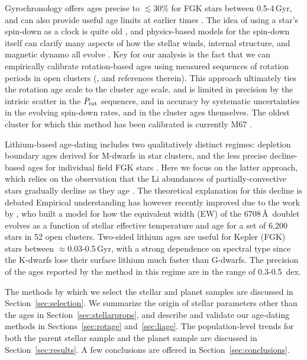 \documentclass[11pt,twocolumn,tighten]{aastex63}
\begin{document}
Gyrochronology offers ages precise to $\lesssim$30\% for FGK stars
between 0.5-4\,Gyr, and can also provide useful age limits at
earlier times \citep{Bouma_2023}.  The idea of using a star's
spin-down as a clock is quite old
\citep{Skumanich_1972,Noyes_1984,Kawaler_1989,Barnes03,Mamajek_2008,Angus_2015},
and physics-based models for the spin-down itself can clarify many
aspects of how the stellar winds, internal structure, and magnetic
dynamo all evolve
\citep[e.g.][]{Matt_2015,Gallet_Bouvier_2015,Spada_2020}.  Key
for our analysis is the fact that we can empirically calibrate
rotation-based ages using measured sequences of rotation periods
in open clusters
(\citealt{Bouma_2023}, and references therein).  This approach
ultimately ties the rotation age scale to the cluster age scale, and
is limited in precision by the intrisic scatter in the $P_{\rm rot}$
sequences, and in accuracy by systematic uncertainties in the evolving
spin-down rates, and in the cluster ages themselves.
The oldest cluster for which this method has been calibrated is currently
M67 \citep[$\approx$4\,Gyr][]{2022ApJ...938..118D}.

Lithium-based age-dating includes two qualitatively distinct regimes:
depletion boundary ages derived for M-dwarfs in star clusters, and the
less precise decline-based ages for individual field FGK stars
\citep{Soderblom_2010}.  Here we focus on the latter approach, which
relies on the observation that the Li abundances of
partially-convective stars gradually decline as they age
\citep[e.g.][]{2005A&A...442..615S}.  The theoretical explanation for
this decline is debated
\citep[e.g.][]{1995ApJ...441..865C,2010ApJ...716.1269D,2019MNRAS.485.4052C}
Empirical understanding has however recently improved due to the work
by \citet{Jeffries_2023}, who built a model for how the equivalent
width (EW) of the  6708\,\AA\ doublet evolves as a function
of stellar effective temperature and age for a set of 6{,}200 stars in
52 open clusters.  Two-sided lithium ages are useful for Kepler (FGK)
stars between $\approx$0.03-0.5\,Gyr, with a strong dependence on
spectral type since the K-dwarfs lose their surface lithium much
faster than G-dwarfs.  The precision of the ages reported by the
\citet{Jeffries_2023} method in this regime are in the range of
0.3-0.5~dex.

The methods by which we select the stellar and planet samples are 
discussed in Section~\ref{sec:selection}.
We summarize the origin of stellar parameters other than the ages in
Section~\ref{sec:stellarprops}, 
and describe and validate our age-dating methods in
Sections~\ref{sec:rotage} and~\ref{sec:liage}.
The population-level trends for both the parent stellar sample and
the planet sample are discussed in Section~\ref{sec:results}.
A few conclusions are offered in Section~\ref{sec:conclusions}.
\end{document}
